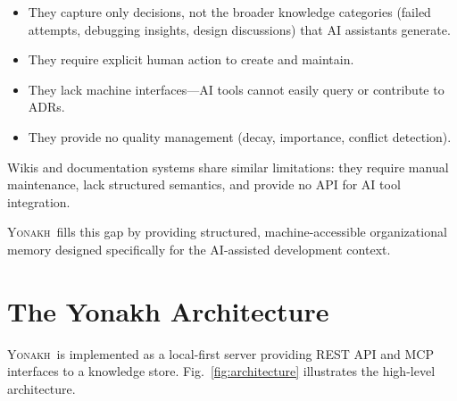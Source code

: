 \documentclass[10pt,journal,compsoc]{IEEEtran}
\newcommand{\yonakh}{\textsc{Yonakh}}
\begin{document}
\begin{itemize}
\item They capture only decisions, not the broader knowledge categories (failed attempts, debugging insights, design discussions) that AI assistants generate.
\item They require explicit human action to create and maintain.
\item They lack machine interfaces---AI tools cannot easily query or contribute to ADRs.
\item They provide no quality management (decay, importance, conflict detection).
\end{itemize}

Wikis and documentation systems share similar limitations: they require manual maintenance, lack structured semantics, and provide no API for AI tool integration.

\yonakh\ fills this gap by providing structured, machine-accessible organizational memory designed specifically for the AI-assisted development context.

\section{The Yonakh Architecture}

\yonakh\ is implemented as a local-first server providing REST API and MCP interfaces to a knowledge store. Fig.~\ref{fig:architecture} illustrates the high-level architecture.
\end{document}
